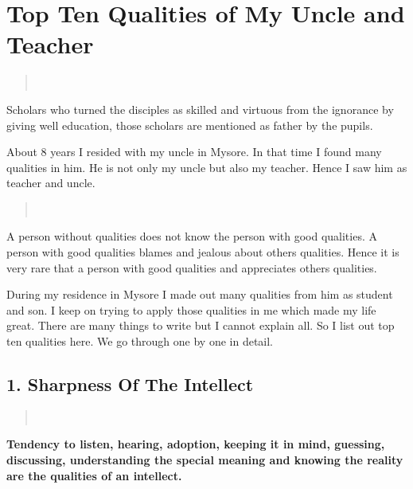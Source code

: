 \chapter{Top Ten Qualities of My Uncle and Teacher}

\begin{center}
\addrule
\end{center}

\begin{verse}
\\
\end{verse}
Scholars who turned the disciples as skilled and virtuous from the ignorance by giving well education, those scholars are mentioned as father by the pupils.

About 8 years I resided with my uncle in Mysore. In that time I found many qualities in him. He is not only my uncle but also my teacher. Hence I saw him as teacher and uncle.
\begin{verse}
\\
\end{verse}
A person without qualities does not know the person with good qualities. A person with good qualities blames and jealous about others qualities. Hence it is very rare that a person with good qualities and appreciates others qualities.

During my residence in Mysore I made out many qualities from him as student and son. I keep on trying to apply those qualities in me which made my life great. There are many things to write but I cannot explain all. So I list out top ten qualities here. We go through one by one in detail.

\section*{1. Sharpness Of The Intellect }

\begin{verse}
\\
\end{verse}
\textbf{Tendency to listen, hearing, adoption, keeping it in mind, guessing, discussing, understanding the special meaning and knowing the reality are the qualities of an intellect.}

